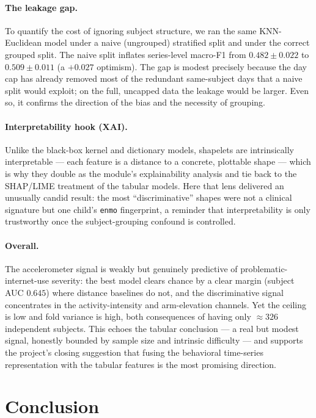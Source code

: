 \paragraph{The leakage gap.} To quantify the cost of ignoring subject structure, we ran the same KNN-Euclidean model under a naive (ungrouped) stratified split and under the correct grouped split. The naive split inflates series-level macro-F1 from $0.482\pm0.022$ to $0.509\pm0.011$ (a $+0.027$ optimism). The gap is modest precisely because the day cap has already removed most of the redundant same-subject days that a naive split would exploit; on the full, uncapped data the leakage would be larger. Even so, it confirms the direction of the bias and the necessity of grouping.

\paragraph{Interpretability hook (XAI).} Unlike the black-box kernel and dictionary models, shapelets are intrinsically interpretable --- each feature is a distance to a concrete, plottable shape --- which is why they double as the module's explainability analysis and tie back to the SHAP/LIME treatment of the tabular models. Here that lens delivered an unusually candid result: the most ``discriminative'' shapes were not a clinical signature but one child's \texttt{enmo} fingerprint, a reminder that interpretability is only trustworthy once the subject-grouping confound is controlled.

\paragraph{Overall.} The accelerometer signal is weakly but genuinely predictive of problematic-internet-use severity: the best model clears chance by a clear margin (subject AUC $0.645$) where distance baselines do not, and the discriminative signal concentrates in the activity-intensity and arm-elevation channels. Yet the ceiling is low and fold variance is high, both consequences of having only $\approx 326$ independent subjects. This echoes the tabular conclusion --- a real but modest signal, honestly bounded by sample size and intrinsic difficulty --- and supports the project's closing suggestion that fusing the behavioral time-series representation with the tabular features is the most promising direction.

\section{Conclusion}


